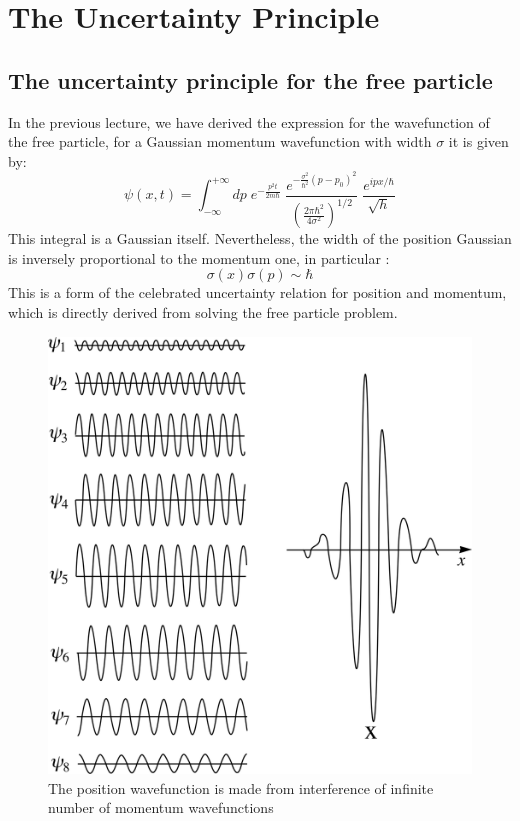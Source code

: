 \chapter{The Uncertainty Principle}
  \section{The uncertainty principle for the free particle}
  
  In the previous lecture, we have derived the expression for the wavefunction of the free particle, for a Gaussian momentum wavefunction with width $ \sigma$ it is given by:
  \begin{equation}
  \psi(x,t) = \int _ {-\infty} ^{+\infty } dp \; e^{ - \frac{p^2 t}{2m \hbar}} \; \frac{e ^{ -\frac{\sigma ^2}{\hbar ^2}( p-p_0)^2} }{(\frac{2\pi \hbar ^2}{4 \sigma^2})^{1/2}} \; \frac{e^{ ipx/\hbar}}{\sqrt{h}}
  \end{equation}
  This integral is a Gaussian itself. Nevertheless, the width of the position Gaussian is inversely proportional to the momentum one, in particular :
  \begin{equation}
  \sigma(x) \sigma(p) \sim \hbar 
  \end{equation}
  This is a form of the celebrated uncertainty relation for position and momentum, which is directly derived from solving the free particle problem.
  \begin{figure} [h!]
  	\centering 
  	\includegraphics[scale = 0.7] {./figures/un}
  	\caption{ The position wavefunction is made from interference of infinite number of momentum wavefunctions}
  	\label{inter}
  \end{figure}
